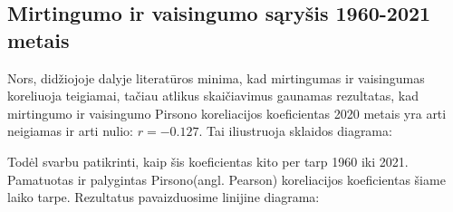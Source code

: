 \subsection{Mirtingumo ir vaisingumo sąryšis 1960-2021 metais}
Nors, didžiojoje dalyje literatūros minima, kad mirtingumas ir vaisingumas koreliuoja teigiamai, tačiau atlikus skaičiavimus gaunamas rezultatas, kad mirtingumo ir vaisingumo Pirsono koreliacijos koeficientas 2020 metais yra arti neigiamas ir arti nulio: $r = -0.127$. Tai iliustruoja sklaidos diagrama:

Todėl svarbu patikrinti, kaip šis koeficientas kito per tarp 1960 iki 2021. Pamatuotas ir palygintas Pirsono(angl. Pearson) koreliacijos koeficientas šiame laiko tarpe. Rezultatus pavaizduosime linijine diagrama:
